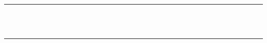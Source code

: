 \begin{center}
\vspace*{0.35\textheight}
\rule{0.5\textwidth}{0.4pt}\\[1ex]
\\[0.5ex]
\rule{0.5\textwidth}{0.4pt}
\end{center}
